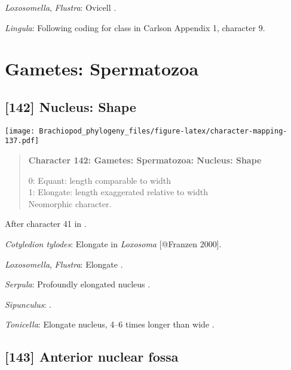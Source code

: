 \documentclass[openany]{book}
\theoremstyle{definition}
\theoremstyle{definition}
\theoremstyle{definition}
\theoremstyle{remark}
\begin{document}
\hypertarget{Flustra-coding-141}{}
\emph{Loxosomella}, \emph{Flustra}: Ovicell \citep{Franzen1977}.

\hypertarget{Lingula-coding-141}{}
\emph{Lingula}: Following coding for class in Carlson
\citeyearpar{Carlson1995Phylogeneticrelationships} Appendix 1, character
9.

\section{Gametes: Spermatozoa}\label{gametes-spermatozoa}

\subsection*{{[}142{]} Nucleus: Shape}\label{nucleus-shape}

\texttt{[image: Brachiopod\_phylogeny\_files/figure-latex/character-mapping-137.pdf]}

\begin{quote}
\textbf{Character 142: Gametes: Spermatozoa: Nucleus: Shape}

0: Equant: length comparable to width\\
1: Elongate: length exaggerated relative to width\\
Neomorphic character.
\end{quote}

After character 41 in \citet{Ponder1997}.

\hypertarget{Cotyledion_tylodes-coding-142}{}
\emph{Cotyledion tylodes}: Elongate in \emph{Loxosoma} {[}@Franzen
2000{]}.

\hypertarget{Flustra-coding-142}{}
\emph{Loxosomella}, \emph{Flustra}: Elongate \citep{Franzen1981}.

\hypertarget{Serpula-coding-142}{}
\emph{Serpula}: Profoundly elongated nucleus \citep{BucklandNicks1988}.

\hypertarget{Sipunculus-coding-142}{}
\emph{Sipunculus}: \citet{Gherardi2011}.

\hypertarget{Tonicella-coding-142}{}
\emph{Tonicella}: Elongate nucleus, 4--6 times longer than wide
\citep{DufresneDube1983}.

\subsection*{{[}143{]} Anterior nuclear
fossa}\label{anterior-nuclear-fossa}
\end{document}
